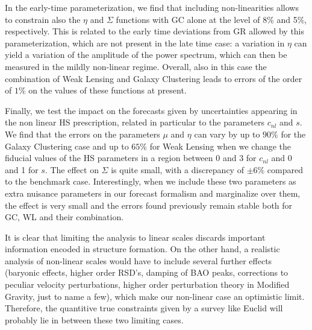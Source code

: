 In the early-time parameterization, we find that including non-linearities allows to constrain also the $\eta$ and $\Sigma$ functions with GC alone at the level of 8\% and 5\%, respectively. This is related to the early time 
deviations from GR allowed by this parameterization, which are not present in the late time case: a variation in $\eta$ can
yield a variation of the amplitude of the power spectrum, which can then be measured in the mildly non-linear regime.
Overall, also in this case the combination of Weak Lensing and Galaxy Clustering leads to errors of the order of $1\%$ on the
values of these functions at present. 


Finally, we test the impact on the forecasts given by uncertainties appearing in the non linear HS prescription, related in particular to the parameters $c_{nl}$ and $s$. We find that
the errors on the parameters $\mu$ and $\eta$ can vary by up to 
$90\%$ for the Galaxy Clustering case and up to $65\%$ for Weak Lensing when we change the fiducial values of the HS parameters in a region between 0 and 3 for $c_{nl}$
and 0 and 1 for $s$. The effect on $\Sigma$ is quite small, with a discrepancy of $\pm 6 \%$ compared to the benchmark case.
Interestingly, when we include these two parameters as extra nuisance parameters in our forecast formalism and marginalize over them, 
the effect is very small and the errors found previously remain stable both for GC, WL and their combination.


It is clear that limiting the analysis to linear scales discards important information encoded in structure formation. On the other hand, a realistic analysis of non-linear scales would have to include several further effects (baryonic effects, higher order RSD's, damping of BAO peaks, corrections
to peculiar velocity perturbations, higher order perturbation theory in Modified Gravity, just to name a few), which make our non-linear case an optimistic limit.
Therefore, the quantitive true constraints given by a survey like Euclid will probably lie in between these two limiting cases. 









  


